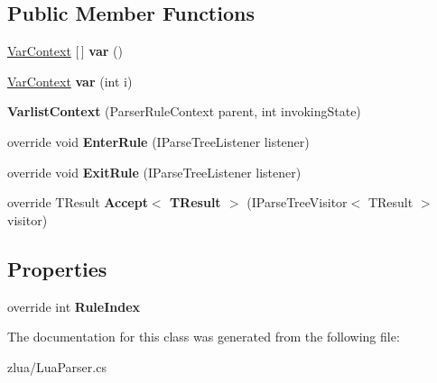 \subsection*{Public Member Functions}
\begin{DoxyCompactItemize}
\item 
\mbox{\label{classzlua_1_1_lua_parser_1_1_varlist_context_afa81d676ae52fe939465c98d7f625c20}} 
\mbox{\hyperlink{classzlua_1_1_lua_parser_1_1_var_context}{Var\+Context}} \mbox{[}$\,$\mbox{]} {\bfseries var} ()
\item 
\mbox{\label{classzlua_1_1_lua_parser_1_1_varlist_context_a22be51ef62035a3c605f9c905354084c}} 
\mbox{\hyperlink{classzlua_1_1_lua_parser_1_1_var_context}{Var\+Context}} {\bfseries var} (int i)
\item 
\mbox{\label{classzlua_1_1_lua_parser_1_1_varlist_context_a05ec4e16373457359e572f00da411b5a}} 
{\bfseries Varlist\+Context} (Parser\+Rule\+Context parent, int invoking\+State)
\item 
\mbox{\label{classzlua_1_1_lua_parser_1_1_varlist_context_a551df90b4e3c1d477524422d1ddfaeff}} 
override void {\bfseries Enter\+Rule} (I\+Parse\+Tree\+Listener listener)
\item 
\mbox{\label{classzlua_1_1_lua_parser_1_1_varlist_context_ad47848cd8e5bd7ad548bb097b04c6993}} 
override void {\bfseries Exit\+Rule} (I\+Parse\+Tree\+Listener listener)
\item 
\mbox{\label{classzlua_1_1_lua_parser_1_1_varlist_context_a9f0be13a309d3d2107e2579f11fcf67a}} 
override T\+Result {\bfseries Accept$<$ T\+Result $>$} (I\+Parse\+Tree\+Visitor$<$ T\+Result $>$ visitor)
\end{DoxyCompactItemize}
\subsection*{Properties}
\begin{DoxyCompactItemize}
\item 
\mbox{\label{classzlua_1_1_lua_parser_1_1_varlist_context_a89f309d1c46ff4705620cdf15e8c7bcb}} 
override int {\bfseries Rule\+Index}
\end{DoxyCompactItemize}


The documentation for this class was generated from the following file\+:\begin{DoxyCompactItemize}
\item 
zlua/Lua\+Parser.\+cs\end{DoxyCompactItemize}
